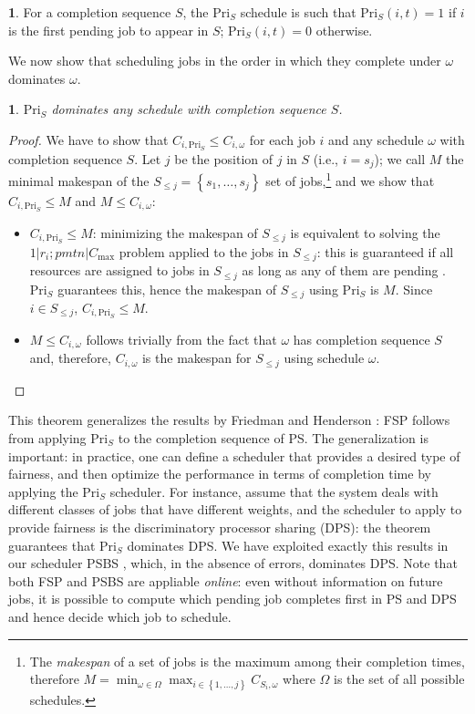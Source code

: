 \documentclass[11pt,oneside,english]{amsart}
\numberwithin{equation}{section}
\numberwithin{figure}{section}
\theoremstyle{definition}
\newtheorem{defn}{\protect\definitionname}
\theoremstyle{plain}
\newtheorem*{thm*}{\protect\theoremname}
\providecommand{\definitionname}{Definition}
\providecommand{\theoremname}{Theorem}
\begin{document}
\begin{defn}
For a completion sequence $S$, the $\mathrm{Pri}_{S}$ schedule is
such that $\mathrm{Pri}_{S}\left(i,t\right)=1$ if $i$ is the first
pending job to appear in $S$; $\mathrm{Pri}_{S}\left(i,t\right)=0$
otherwise.
\end{defn}
We now show that scheduling jobs in the order in which they complete
under $\omega$ dominates $\omega$.
\begin{thm*}
$\mathrm{Pri}_{S}$ dominates any schedule with completion sequence
$S$.\end{thm*}
\begin{proof}
We have to show that $C_{i,\mathrm{Pri}_{S}}\leq C_{i,\omega}$ for
each job $i$ and any schedule $\omega$ with completion sequence
$S$. Let $j$ be the position of $j$ in $S$ (i.e., $i=s_{j}$); we call $M$ the minimal makespan of the $S_{\leq j}=\left\{ s_{1},\ldots,s_{j}\right\} $
set of jobs,\footnote{The \emph{makespan} of a set of jobs is the maximum among their completion
times, therefore $M=\min_{\omega\in\Omega}\max_{i\in\left\{ 1,\ldots,j\right\} }C_{S_{i},\omega}$
where $\Omega$ is the set of all possible schedules.} and we show that $C_{i,\mathrm{Pri}_{S}}\leq M$ and $M\leq C_{i,\omega}$:
\begin{itemize}
\item $C_{i,\mathrm{Pri}_{S}}\leq M$: minimizing the makespan of $S_{\leq j}$
is equivalent to solving the $1|r_{i};pmtn|C_{\max}$ problem applied
to the jobs in $S_{\leq j}$: this is guaranteed if all resources
are assigned to jobs in $S_{\leq j}$ as long as any of them are pending
\cite{Liu1973}. $\mathrm{Pri}_{S}$ guarantees this, hence the makespan
of $S_{\leq j}$ using $\mathrm{Pri}_{S}$ is $M$. Since $i\in S_{\leq j}$,
$C_{i,\mathrm{Pri}_{S}}\leq M$.
\item $M\leq C_{i,\omega}$ follows trivially from the fact that $\omega$
has completion sequence $S$ and, therefore, $C_{i,\omega}$ is the
makespan for $S_{\leq j}$ using schedule $\omega$.
\qedhere
\end{itemize}
\end{proof}
This theorem generalizes the results by Friedman and Henderson
 \cite{Friedman2003}: FSP follows from applying $\mathrm{Pri}_{S}$
to the completion sequence of PS.
The generalization is important: in practice, one can define 
a scheduler that provides a desired type of fairness, and then optimize
the performance in terms of completion time by applying the $\mathrm{Pri}_{S}$
scheduler. For instance, assume that the system deals with different 
classes of jobs that have different weights, and the scheduler to apply 
to provide fairness is the discriminatory processor sharing (DPS): the 
theorem guarantees that $\mathrm{Pri}_{S}$ dominates DPS. We have exploited
exactly this results in our scheduler PSBS \cite{DellAmico2014}, which, 
in the absence of errors, dominates DPS.
Note that both FSP and
PSBS are appliable \emph{online}: even without information on
future jobs, it is possible to compute which pending job completes
first in PS and DPS and hence decide which job to schedule.
\end{document}
